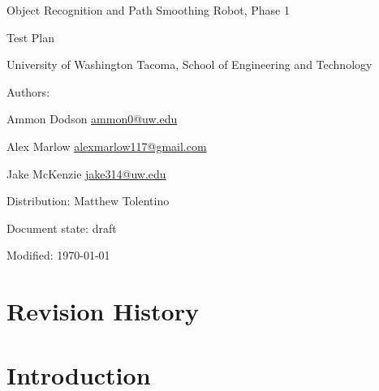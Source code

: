 \documentclass[english,12pt]{article}
\begin{document}
\begin{center}

\thispagestyle{empty}

$ $

\vspace{250pt}

\begin{bfseries}

{\Large Object Recognition and Path Smoothing Robot, Phase 1}

{\Huge Test Plan}


\end{bfseries}

\vspace{180pt}

University of Washington Tacoma, School of Engineering and Technology


\vspace{12pt}

Authors: 

Ammon Dodson \href{mailto:ammon0@uw.edu}{ammon0@uw.edu} 

Alex Marlow \href{mailto:alexmarlow117@gmail.com}{alexmarlow117@gmail.com} 

Jake McKenzie \href{mailto:jake314@uw.edu}{jake314@uw.edu}

Distribution: Matthew Tolentino

Document state: draft

Modified: \today

\end{center}

\newpage


\tableofcontents

\newpage


\section{Revision History}



\section{Introduction}
\end{document}
